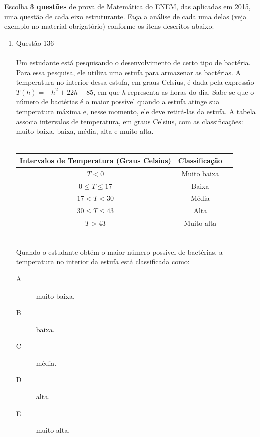 \documentclass[a4paper, 12pt]{article}
\begin{document}
Escolha \underline{\textbf{3 questões}} de prova de Matemática do ENEM, das aplicadas em 2015, uma questão de cada eixo estruturante. Faça a análise de cada uma delas (veja  exemplo no material obrigatório) conforme os itens descritos abaixo:
\begin{enumerate}
\item Questão 136 \\\\
  Um  estudante  está  pesquisando  o  desenvolvimento de certo tipo de bactéria. Para essa pesquisa, ele utiliza uma  estufa  para  armazenar  as  bactérias.  A  temperatura no  interior  dessa  estufa,  em  graus  Celsius,  é  dada  pela expressão $T(h) = -h^{2}  +  22h - 85 $,  em  que  \emph{h}  representa  as horas do dia. Sabe-se que o número de bactérias é o maior  possível  quando  a  estufa  atinge  sua  temperatura  máxima e, nesse momento, ele deve retirá-las da estufa. A  tabela  associa  intervalos  de  temperatura,  em  graus  Celsius, com as classificações: muito baixa, baixa, média, alta e muito alta. \\\\
  \begin{tabular}{ | c | c | c |}
    \hline
    Intervalos de Temperatura (Graus Celsius) & Classificação \\ \hline
    $ T < 0 $ & Muito baixa \\ \hline
    $ 0 \leq T \leq 17 $ & Baixa \\ \hline
    $ 17 < T < 30 $ & Média \\ \hline
    $ 30 \leq T \leq 43 $ & Alta \\ \hline
    $ T > 43 $ & Muito alta \\ \hline    
  \end{tabular} \\

  Quando o estudante obtém o maior número possível de bactérias, a temperatura no interior da estufa está classificada como:
  \begin{description}
  \item[A] muito baixa.
  \item[B] baixa.
  \item[C] média.
  \item[D] alta.
  \item[E] muito alta.
  \end{description}
  

\end{enumerate}
\end{document}
